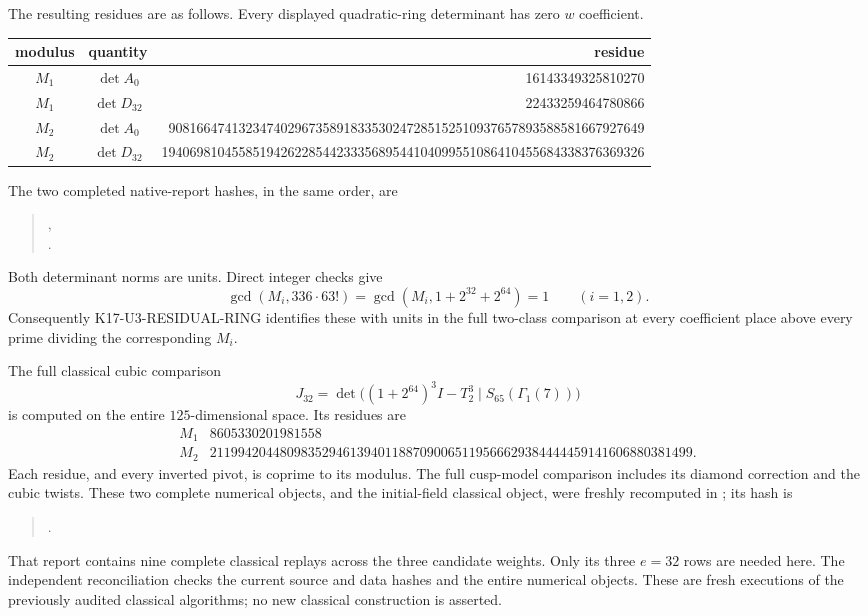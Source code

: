 The resulting residues are as follows.  Every displayed
quadratic-ring determinant has zero $w$ coefficient.
\begin{center}\small\setlength{\tabcolsep}{5pt}
\begin{tabular}{c|c|r}
modulus&quantity&residue\\\hline
$M_1$&$\det A_0$&16143349325810270\\
$M_1$&$\det D_{32}$&22433259464780866\\
$M_2$&$\det A_0$&90816647413234740296735891833530247285152510937657893588581667927649\\
$M_2$&$\det D_{32}$&194069810455851942622854423335689544104099551086410455684338376369326
\end{tabular}
\end{center}
The two completed native-report hashes, in the same order,
are
\begin{quote}\small
{},\\
.
\end{quote}
Both determinant norms are units.  Direct integer checks give
\[
 \gcd(M_i,336\cdot63!)=
 \gcd(M_i,1+2^{32}+2^{64})=1\qquad(i=1,2).                 \tag{KN.4}
\]
Consequently K17-U3-RESIDUAL-RING identifies these with units
in the full two-class comparison at every coefficient place
above every prime dividing the corresponding $M_i$.

The full classical cubic comparison
\[
 J_{32}=\det\bigl((1+2^{64})^3I-T_2^3\mid
                                  S_{65}(\Gamma_1(7))\bigr)
                                                                  \tag{KN.5}
\]
is computed on the entire $125$-dimensional space.  Its residues
are
\[
\begin{array}{c|r}
 M_1&8605330201981558\\
 M_2&211994204480983529461394011887090065119566629384444459141606880381499.
\end{array}                                                   \tag{KN.6}
\]
Each residue, and every inverted pivot, is coprime to its
modulus.  The full cusp-model comparison includes its diamond
correction and the cubic twists.  These two complete numerical
objects, and the initial-field classical object, were freshly
recomputed in ; its hash is
\begin{quote}\small
{}.
\end{quote}
That report contains nine complete classical replays across
the three candidate weights.  Only its three $e=32$ rows are
needed here.  The independent reconciliation checks the
current source and data hashes and the entire numerical
objects.  These are fresh executions of the previously audited
classical algorithms; no new classical construction is asserted.

